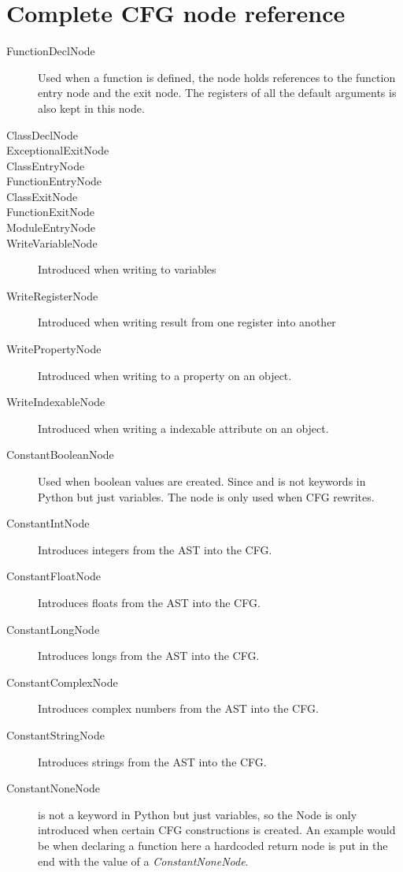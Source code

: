 \chapter{Complete CFG node reference}
\label{chapter:NodeRef}

\begin{description}
	\item[FunctionDeclNode ] Used when a function is defined, the node holds references to the function entry node and the exit node. The registers of all the default arguments is also kept in this node.
	\item[ClassDeclNode ]  
	\item[ExceptionalExitNode]
	\item[ClassEntryNode]
	\item[FunctionEntryNode] 
	\item[ClassExitNode]
	\item[FunctionExitNode]
	\item[ModuleEntryNode] 
	\item[WriteVariableNode ] Introduced when writing to variables
	\item[WriteRegisterNode ] Introduced when writing result from one register into another
	\item[WritePropertyNode ] Introduced when writing to a property on an object.
	\item[WriteIndexableNode ] Introduced when writing a indexable attribute on an object.
	\item[ConstantBooleanNode] Used when boolean values are created. Since  and  is not keywords in Python but just variables. The node is only used when CFG rewrites.
	\item[ConstantIntNode] Introduces integers from the AST into the CFG.
	\item[ConstantFloatNode] Introduces floats from the AST into the CFG.
	\item[ConstantLongNode] Introduces longs from the AST into the CFG.
	\item[ConstantComplexNode] Introduces complex numbers from the AST into the CFG.
	\item[ConstantStringNode] Introduces strings from the AST into the CFG.
	\item[ConstantNoneNode]  is not a keyword in Python but just variables, so the Node is only introduced when certain CFG constructions is created. An example would be when declaring a function here a hardcoded return node is put in the end with the value of a \textit{ConstantNoneNode}.

\end{description}
